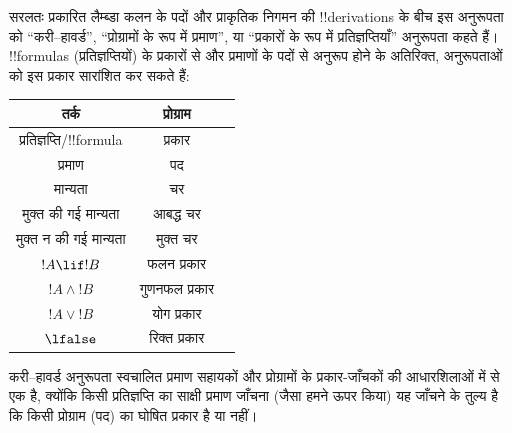 \documentclass[../../../include/open-logic-section]{subfiles}
\begin{document}
सरलतः प्रकारित लैम्ब्डा कलन के पदों और प्राकृतिक निगमन की !!{derivation}s के
बीच इस अनुरूपता को ``करी--हावर्ड'', ``प्रोग्रामों के रूप में प्रमाण'', या
``प्रकारों के रूप में प्रतिज्ञप्तियाँ'' अनुरूपता कहते हैं। !!{formula}s
(प्रतिज्ञप्तियों) के प्रकारों से और प्रमाणों के पदों से अनुरूप होने के अतिरिक्त,
अनुरूपताओं को इस प्रकार सारांशित कर सकते हैं:
\begin{center}
  \begin{tabular}{c c c}
    तर्क & प्रोग्राम \\
    \hline
    प्रतिज्ञप्ति/!!{formula} & प्रकार \\
    प्रमाण & पद \\
    मान्यता & चर \\
    मुक्त की गई मान्यता & आबद्ध चर \\
    मुक्त न की गई मान्यता & मुक्त चर \\
    $!A \lif !B$ & फलन प्रकार \\
    $!A \land !B$ & गुणनफल प्रकार \\
    $!A \lor !B$ & योग प्रकार \\
    $\lfalse$ & रिक्त प्रकार \\
    \hline
  \end{tabular}
\end{center}

करी--हावर्ड अनुरूपता स्वचालित प्रमाण सहायकों और प्रोग्रामों के प्रकार-जाँचकों
की आधारशिलाओं में से एक है, क्योंकि किसी प्रतिज्ञप्ति का साक्षी प्रमाण जाँचना
(जैसा हमने ऊपर किया) यह जाँचने के तुल्य है कि किसी प्रोग्राम (पद) का घोषित
प्रकार है या नहीं।
\end{document}
